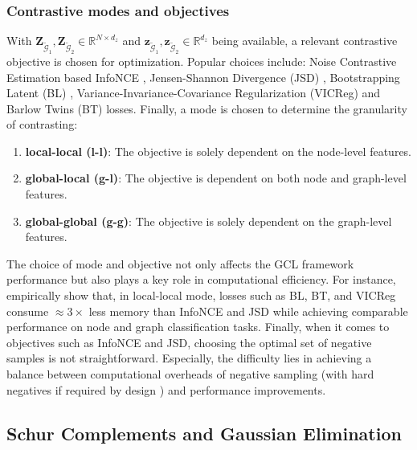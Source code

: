 \documentclass{article}
\def\mZ{{\mathbf{Z}}}
\def\vz{{\mathbf{z}}}
\def\gG{{\mathcal{G}}}
\def\sR{{\mathbb{R}}}
\theoremstyle{plain}
\theoremstyle{definition}
\theoremstyle{remark}
\begin{document}
\subsubsection{Contrastive modes and objectives}

With $\mZ_{\widetilde{\gG}_1}, \mZ_{\widetilde{\gG}_2} \in \sR^{N \times d_z}$ and $\vz_{\widetilde{\gG}_1}, \vz_{\widetilde{\gG}_2} \in \sR^{d_z}$ being available, a relevant contrastive objective is chosen for optimization. Popular choices include: Noise Contrastive Estimation based InfoNCE \cite{oord2018representation}, Jensen-Shannon Divergence (JSD) \cite{lin1991divergence}, Bootstrapping Latent (BL) \cite{grill2020bootstrap}, Variance-Invariance-Covariance Regularization (VICReg) \cite{bardes2021vicreg} and Barlow Twins (BT) \cite{zbontar2021barlow} losses. Finally, a mode is chosen to determine the granularity of contrasting:

\begin{enumerate}
    \item \textbf{local-local (l-l)}: The objective is solely dependent on the node-level features.
    \item \textbf{global-local (g-l)}: The objective is dependent on both node and graph-level features.
    \item \textbf{global-global (g-g)}: The objective is solely dependent on the graph-level features.
\end{enumerate}

The choice of mode and objective not only affects the GCL framework performance but also plays a key role in computational efficiency. For instance, \citet{zhu2021empirical} empirically show that, in local-local mode, losses such as BL, BT, and VICReg consume $\approx 3\times$ less memory than InfoNCE and JSD while achieving comparable performance on node and graph classification tasks. Finally, when it comes to objectives such as InfoNCE and JSD, choosing the optimal set of negative samples is not straightforward. Especially, the difficulty lies in achieving a balance between computational overheads of negative sampling \citep{chuang2020debiased} (with hard negatives if required by design \citep{robinson2020contrastive}) and performance improvements.

\subsection{Schur Complements and Gaussian Elimination }
\end{document}
